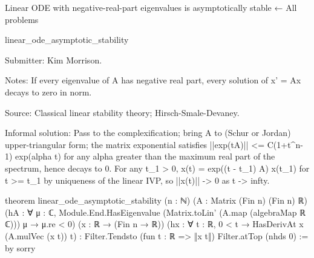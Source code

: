 Linear ODE with negative-real-part eigenvalues is asymptotically stable
← All problems

linear_ode_asymptotic_stability

Submitter: Kim Morrison.

Notes: If every eigenvalue of A has negative real part, every solution of x' = Ax decays to zero in norm.

Source: Classical linear stability theory; Hirsch-Smale-Devaney.

Informal solution: Pass to the complexification; bring A to (Schur or Jordan) upper-triangular form; the matrix exponential satisfies ||exp(tA)|| <= C(1+t^{n-1}) exp(alpha t) for any alpha greater than the maximum real part of the spectrum, hence decays to 0. For any t_1 > 0, x(t) = exp((t - t_1) A) x(t_1) for t >= t_1 by uniqueness of the linear IVP, so ||x(t)|| -> 0 as t -> infty.

theorem linear_ode_asymptotic_stability (n : ℕ) (A : Matrix (Fin n) (Fin n) ℝ)
    (hA : ∀ μ : ℂ,
        Module.End.HasEigenvalue
          (Matrix.toLin' (A.map (algebraMap ℝ ℂ))) μ → μ.re < 0)
    (x : ℝ → (Fin n → ℝ))
    (hx : ∀ t : ℝ, 0 < t → HasDerivAt x (A.mulVec (x t)) t) :
    Filter.Tendsto (fun t : ℝ => ‖x t‖) Filter.atTop (nhds 0) := by
  sorry
